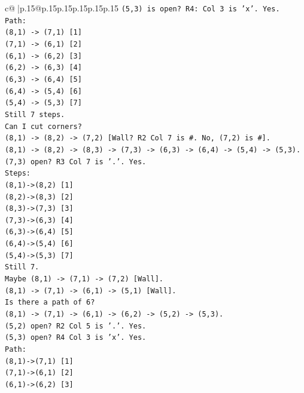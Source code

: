 \documentclass{article}
\begin{document}
{\begin{supertabular}{c@{$\;$}|p{.15\linewidth}@{}p{.15\linewidth}p{.15\linewidth}p{.15\linewidth}p{.15\linewidth}p{.15\linewidth}}
{{{\texttt{(5,3) is open? R4: Col 3 is 'x'. Yes.} \\
\texttt{Path:} \\
\texttt{(8,1) {-}> (7,1) {[}1{]}} \\
\texttt{(7,1) {-}> (6,1) {[}2{]}} \\
\texttt{(6,1) {-}> (6,2) {[}3{]}} \\
\texttt{(6,2) {-}> (6,3) {[}4{]}} \\
\texttt{(6,3) {-}> (6,4) {[}5{]}} \\
\texttt{(6,4) {-}> (5,4) {[}6{]}} \\
\texttt{(5,4) {-}> (5,3) {[}7{]}} \\
\texttt{Still 7 steps.} \\
\texttt{Can I cut corners?} \\
\texttt{(8,1) {-}> (8,2) {-}> (7,2) {[}Wall? R2 Col 7 is \#. No, (7,2) is \#{]}.} \\
\texttt{(8,1) {-}> (8,2) {-}> (8,3) {-}> (7,3) {-}> (6,3) {-}> (6,4) {-}> (5,4) {-}> (5,3).} \\
\texttt{(7,3) open? R3 Col 7 is '.'. Yes.} \\
\texttt{Steps:} \\
\texttt{(8,1){-}>(8,2) {[}1{]}} \\
\texttt{(8,2){-}>(8,3) {[}2{]}} \\
\texttt{(8,3){-}>(7,3) {[}3{]}} \\
\texttt{(7,3){-}>(6,3) {[}4{]}} \\
\texttt{(6,3){-}>(6,4) {[}5{]}} \\
\texttt{(6,4){-}>(5,4) {[}6{]}} \\
\texttt{(5,4){-}>(5,3) {[}7{]}} \\
\texttt{Still 7.} \\
\texttt{Maybe (8,1) {-}> (7,1) {-}> (7,2) {[}Wall{]}.} \\
\texttt{(8,1) {-}> (7,1) {-}> (6,1) {-}> (5,1) {[}Wall{]}.} \\
\texttt{Is there a path of 6?} \\
\texttt{(8,1) {-}> (7,1) {-}> (6,1) {-}> (6,2) {-}> (5,2) {-}> (5,3).} \\
\texttt{(5,2) open? R2 Col 5 is '.'. Yes.} \\
\texttt{(5,3) open? R4 Col 3 is 'x'. Yes.} \\
\texttt{Path:} \\
\texttt{(8,1){-}>(7,1) {[}1{]}} \\
\texttt{(7,1){-}>(6,1) {[}2{]}} \\
\texttt{(6,1){-}>(6,2) {[}3{]}} \\
}}}
\end{supertabular}}
\end{document}
